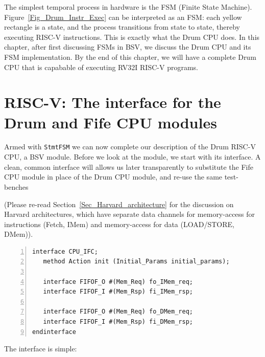 The simplest temporal process in hardware is the FSM (Finite State
Machine).  Figure~\ref{Fig_Drum_Instr_Exec} can be interpreted as an
FSM: each yellow rectangle is a state, and the process transitions
from state to state, thereby executing RISC-V instructions.  This is
exactly what the Drum CPU does.  In this chapter, after first
discussing FSMs in BSV, we discuss the Drum CPU and its FSM
implementation.  By the end of this chapter, we will have a complete
Drum CPU that is capabable of executing RV32I RISC-V programs.


\section{RISC-V: The interface for the Drum and Fife CPU modules}

\label{Sec_Drum_CPU_interface}

Armed with {\tt StmtFSM} we can now complete our description of the
Drum RISC-V CPU, a BSV module.  Before we look at the module, we start
with its interface.  A clean, common interface will allows us later
transparently to substitute the Fife CPU module in place of the Drum
CPU module, and re-use the same test-benches {\etc}


(Please re-read Section~\ref{Sec_Harvard_architecture} for the
discussion on Harvard architectures, which have separate data channels
for memory-access for instructions (Fetch, IMem) and memory-access for
data (LOAD/STORE, DMem)).

{\small
\begin{Verbatim}[frame=single, numbers=left]
interface CPU_IFC;
   method Action init (Initial_Params initial_params);

   interface FIFOF_O #(Mem_Req) fo_IMem_req;
   interface FIFOF_I #(Mem_Rsp) fi_IMem_rsp;

   interface FIFOF_O #(Mem_Req) fo_DMem_req;
   interface FIFOF_I #(Mem_Rsp) fi_DMem_rsp;
endinterface
\end{Verbatim}
}

The interface is simple:

